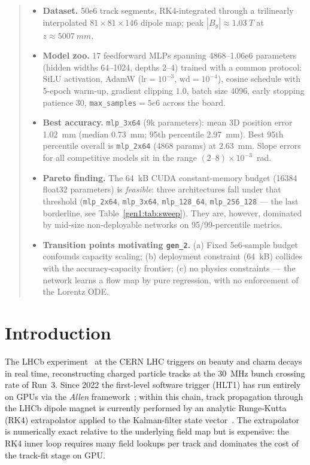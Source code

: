 \documentclass[a4paper,11pt]{article}
\newcommand{\SI}[2]{#1~#2}
\newcommand{\num}[1]{#1}
\newcommand{\kilo}{k}
\newcommand{\byte}{B}
\newcommand{\tesla}{T}
\newcommand{\mega}{M}
\newcommand{\hertz}{Hz}
\newcommand{\mm}{mm}
\begin{document}
\begin{quote}\small
\begin{itemize}\setlength{\itemsep}{2pt}
\item \textbf{Dataset.} \num{50e6} track segments, RK4-integrated through a
  trilinearly interpolated $81\times81\times146$ dipole map; peak $|B_y|
  \approx \SI{1.03}{\tesla}$ at $z \approx \SI{5007}{\mm}$.
\item \textbf{Model zoo.} 17 feedforward MLPs spanning \num{4868}--\num{1.06e6}
  parameters (hidden widths 64--1024, depths 2--4) trained with a common
  protocol: SiLU activation, AdamW ($\mathrm{lr}=10^{-3}$, $\mathrm{wd}=10^{-4}$),
  cosine schedule with 5-epoch warm-up, gradient clipping $1.0$, batch size
  $4096$, early stopping patience $30$, \texttt{max\_samples}$=\num{5e6}$
  across the board.
\item \textbf{Best accuracy.} \texttt{mlp\_3x64} (9k parameters): mean 3D
  position error \SI{1.02}{\mm} (median \SI{0.73}{\mm}; 95th percentile
  \SI{2.97}{\mm}).  Best 95th percentile overall is \texttt{mlp\_2x64}
  (\num{4868} params) at \SI{2.63}{\mm}.  Slope errors for all competitive
  models sit in the range $(2\text{--}8)\!\times\!10^{-3}$~rad.
\item \textbf{Pareto finding.} The \SI{64}{\kilo\byte} CUDA constant-memory
  budget (\num{16384} float32 parameters) is \emph{feasible}: three
  architectures fall under that threshold (\texttt{mlp\_2x64},
  \texttt{mlp\_3x64}, \texttt{mlp\_128\_64}, \texttt{mlp\_256\_128} ---
  the last borderline, see Table~\ref{gen1:tab:sweep}).  They are, however,
  dominated by mid-size non-deployable networks on 95/99-percentile metrics.
\item \textbf{Transition points motivating \texttt{gen\_2}.}
  (a) Fixed \num{5e6}-sample budget confounds capacity scaling;
  (b) deployment constraint (\SI{64}{\kilo\byte}) collides with the
  accuracy-capacity frontier;
  (c) no physics constraints --- the network learns a flow map by pure
  regression, with no enforcement of the Lorentz ODE.
\end{itemize}
\end{quote}

\section{Introduction}\label{gen1:sec:intro}

The LHCb experiment~\cite{LHCbDetector2008} at the CERN LHC triggers on
beauty and charm decays in real time, reconstructing charged particle
tracks at the \SI{30}{\mega\hertz} bunch crossing rate of Run~3.  Since
2022 the first-level software trigger (HLT1) has run entirely on
GPUs via the \emph{Allen} framework~\cite{Allen2020}; within this chain,
track propagation through the LHCb dipole magnet is currently performed
by an analytic Runge-Kutta (RK4) extrapolator applied to the Kalman-filter
state vector~\cite{Fruhwirth1987}.  The extrapolator is numerically exact
relative to the underlying field map but is expensive: the RK4 inner loop
requires many field lookups per track and dominates the cost of the
track-fit stage on GPU.
\end{document}
